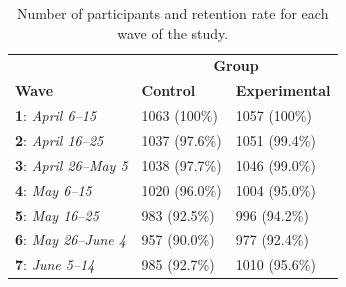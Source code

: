 \documentclass[authordate, empirical]{jote-new-article}
\begin{document}
\begin{table}
  \begin{fullwidth}
    \caption{Number of participants and retention rate for each wave of the study.}
    \begin{tabularx}{\linewidth}{@{} X X X @{}}
                                           & \multicolumn{2}{c}{\hspace*{-3em}\textbf{Group}}                         \\
      \textbf{Wave}                        & \textbf{Control}                                 & \textbf{Experimental} \\
      \hline \textbf{1}: \emph{April 6–15} & 1063 (100\%)                                     & 1057 (100\%)          \\

      \textbf{2}: \emph{April 16–25}       & 1037 (97.6\%)                                    & 1051 (99.4\%)         \\

      \textbf{3}: \emph{April 26–May 5}    & 1038 (97.7\%)                                    & 1046 (99.0\%)         \\

      \textbf{4}: \emph{May 6–15}          & 1020 (96.0\%)                                    & 1004 (95.0\%)         \\

      \textbf{5}: \emph{May 16–25}         & 983 (92.5\%)                                     & 996 (94.2\%)          \\

      \textbf{6}: \emph{May 26–June 4}     & 957 (90.0\%)                                     & 977 (92.4\%)          \\

      \textbf{7}: \emph{June 5–14}         & 985 (92.7\%)                                     & 1010 (95.6\%)         \\
    \end{tabularx}
  \end{fullwidth}
\end{table}
\end{document}
